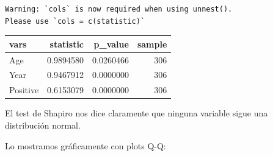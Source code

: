 \documentclass[
]{article}
\newenvironment{Shaded}{\begin{snugshade}}{\end{snugshade}}
\newcommand{\ControlFlowTok}[1]{\textcolor[rgb]{0.13,0.29,0.53}{\textbf{#1}}}
\newcommand{\DataTypeTok}[1]{\textcolor[rgb]{0.13,0.29,0.53}{#1}}
\newcommand{\DecValTok}[1]{\textcolor[rgb]{0.00,0.00,0.81}{#1}}
\newcommand{\KeywordTok}[1]{\textcolor[rgb]{0.13,0.29,0.53}{\textbf{#1}}}
\newcommand{\NormalTok}[1]{#1}
\newcommand{\OperatorTok}[1]{\textcolor[rgb]{0.81,0.36,0.00}{\textbf{#1}}}
\newcommand{\StringTok}[1]{\textcolor[rgb]{0.31,0.60,0.02}{#1}}
\begin{document}
\begin{verbatim}
Warning: `cols` is now required when using unnest().
Please use `cols = c(statistic)`
\end{verbatim}

\begin{tabular}{l|r|r|r}
\hline
vars & statistic & p\_value & sample\\
\hline
Age & 0.9894580 & 0.0260466 & 306\\
\hline
Year & 0.9467912 & 0.0000000 & 306\\
\hline
Positive & 0.6153079 & 0.0000000 & 306\\
\hline
\end{tabular}

El test de Shapiro nos dice claramente que ninguna variable sigue una
distribución normal.

Lo mostramos gráficamente con plots Q-Q:

\begin{Shaded}
\end{Shaded}
\end{document}
